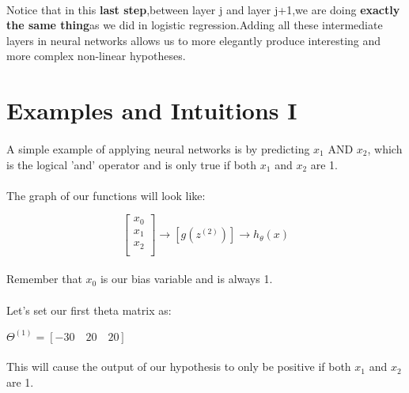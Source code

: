 \documentclass[UTF8]{ctexart}
\begin{document}
\paragraph{}
Notice that in this \textbf{last step},between layer j and layer j+1,we are doing \textbf{exactly the same thing}as we did in logistic regression.Adding all these intermediate layers in neural networks allows us to more elegantly produce interesting and more complex non-linear hypotheses.
\newpage
\section{Examples and Intuitions I}
\paragraph{}
A simple example of applying neural networks is by predicting $x_{1}$ AND $x_{2}$, which is the logical 'and' operator and is only true if both $x_{1}$ and $x_{2}$ are 1.
\paragraph{}
The graph of our functions will look like:
\begin{algorithm}
\begin{equation}
\left[\begin{array}{c}
x_{0}\\
x_{1}\\
x_{2}\\
\end{array}\right] \rightarrow  [g(z^{(2)})]
\rightarrow h_{\theta}(x) 
\end{equation}
\end{algorithm}
\paragraph{}
Remember that $x_{0}$ is our bias variable and is always 1.
\paragraph{}
Let's set our first theta matrix as:
\begin{algorithm}
$\Theta^{(1)}=[-30\quad20\quad20]$
\end{algorithm}
\paragraph{}
This will cause the output of our hypothesis to only be positive if both $x_{1}$ and $x_{2}$are 1.
\end{document}

